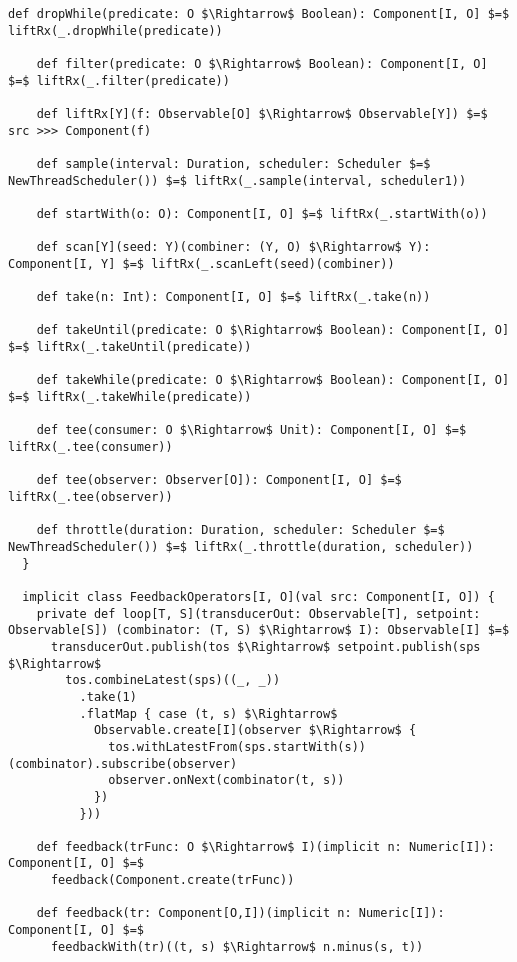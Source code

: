 \begin{lstlisting}[style=ScalaStyle, caption={Operators on \comp}, label={lst:component-operators}]
    def dropWhile(predicate: O $\Rightarrow$ Boolean): Component[I, O] $=$ liftRx(_.dropWhile(predicate))

    def filter(predicate: O $\Rightarrow$ Boolean): Component[I, O] $=$ liftRx(_.filter(predicate))

    def liftRx[Y](f: Observable[O] $\Rightarrow$ Observable[Y]) $=$ src >>> Component(f)

    def sample(interval: Duration, scheduler: Scheduler $=$ NewThreadScheduler()) $=$ liftRx(_.sample(interval, scheduler1))

    def startWith(o: O): Component[I, O] $=$ liftRx(_.startWith(o))

    def scan[Y](seed: Y)(combiner: (Y, O) $\Rightarrow$ Y): Component[I, Y] $=$ liftRx(_.scanLeft(seed)(combiner))

    def take(n: Int): Component[I, O] $=$ liftRx(_.take(n))

    def takeUntil(predicate: O $\Rightarrow$ Boolean): Component[I, O] $=$ liftRx(_.takeUntil(predicate))

    def takeWhile(predicate: O $\Rightarrow$ Boolean): Component[I, O] $=$ liftRx(_.takeWhile(predicate))

    def tee(consumer: O $\Rightarrow$ Unit): Component[I, O] $=$ liftRx(_.tee(consumer))

    def tee(observer: Observer[O]): Component[I, O] $=$ liftRx(_.tee(observer))

    def throttle(duration: Duration, scheduler: Scheduler $=$ NewThreadScheduler()) $=$ liftRx(_.throttle(duration, scheduler))
  }
  
  implicit class FeedbackOperators[I, O](val src: Component[I, O]) {
    private def loop[T, S](transducerOut: Observable[T], setpoint: Observable[S]) (combinator: (T, S) $\Rightarrow$ I): Observable[I] $=$
      transducerOut.publish(tos $\Rightarrow$ setpoint.publish(sps $\Rightarrow$
        tos.combineLatest(sps)((_, _))
          .take(1)
          .flatMap { case (t, s) $\Rightarrow$
            Observable.create[I](observer $\Rightarrow$ {
              tos.withLatestFrom(sps.startWith(s))(combinator).subscribe(observer)
              observer.onNext(combinator(t, s))
            })
          }))

    def feedback(trFunc: O $\Rightarrow$ I)(implicit n: Numeric[I]): Component[I, O] $=$
      feedback(Component.create(trFunc))

    def feedback(tr: Component[O,I])(implicit n: Numeric[I]): Component[I, O] $=$
      feedbackWith(tr)((t, s) $\Rightarrow$ n.minus(s, t))


\end{lstlisting}
